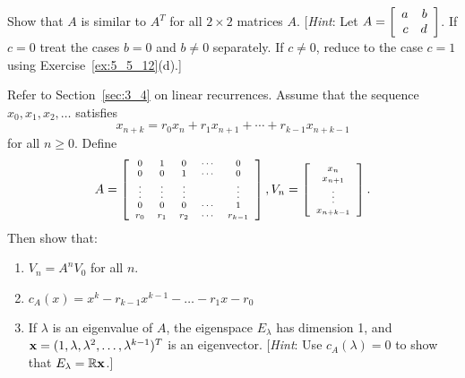 \begin{multicols}{2}
\begin{ex}
Show that $A$ is similar to $A^{T}$ for all $2 \times 2$ matrices $A$. [\textit{Hint}: Let $A = \left[ \begin{array}{rr}
a & b \\
c & d
\end{array} \right]$. If $c = 0$ treat the cases $b = 0$ and $b \neq 0$ separately. If $c \neq 0$, reduce to the case $c = 1$ using Exercise~\ref{ex:5_5_12}(d).]
\end{ex}

\begin{ex}
Refer to Section~\ref{sec:3_4} on linear recurrences. Assume that the sequence $x_{0}, x_{1}, x_{2}, \dots$ satisfies
\vspace*{-1em}
\begin{equation*}
x_{n+k} = r_0x_n + r_1x_{n+1} + \dotsb + r_{k-1}x_{n+k-1}
\end{equation*}
for all $n \geq 0$. Define
\begin{equation*}
A = 
\scriptsize \left[ \begin{array}{ccccc}
0 & 1 & 0 & \cdots & 0 \\
0 & 0 & 1 & \cdots & 0 \\
\vdots & \vdots & \vdots & & \vdots \\
0 & 0 & 0 & \cdots & 1 \\
r_0 & r_1 & r_2 & \cdots & r_{k-1}
\end{array} \right], V_n =
\left[ \begin{array}{cccc}
x_n \\
x_{n+1} \\
\vdots \\
x_{n+k-1}
\end{array} \right].
\end{equation*}
Then show that:
\vspace*{-1em}
\begin{enumerate}[label={\alph*.}]
\item $V_{n} = A^{n}V_{0}$ for all $n$.

\item $c_{A}(x) = x^{k} - r_{k-1}x^{k-1} - \dots - r_{1}x - r_{0}$

\item If $\lambda$ is an eigenvalue of $A$, the eigenspace $E_{\lambda}$ has dimension 1, and $\textbf{x} = (1, \lambda, \lambda^{2}, \dots, \lambda^{k-1})^{T}$ is an eigenvector. [\textit{Hint}: Use $c_{A}(\lambda) = 0$ to show that $E_{\lambda} = \mathbb{R}\textbf{x}$.]


\end{enumerate}
\end{ex}
\end{multicols}
